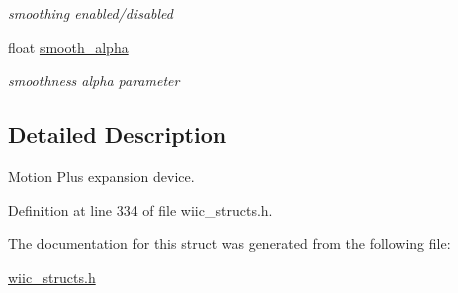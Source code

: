 \begin{DoxyCompactItemize}
\begin{DoxyCompactList}\small\item\em smoothing enabled/disabled \end{DoxyCompactList}\item 
\hypertarget{structmotion__plus__t_ab5eda5d43a79e927542d25338c3a7989}{float \hyperlink{structmotion__plus__t_ab5eda5d43a79e927542d25338c3a7989}{smooth\-\_\-alpha}}\label{structmotion__plus__t_ab5eda5d43a79e927542d25338c3a7989}

\begin{DoxyCompactList}\small\item\em smoothness alpha parameter \end{DoxyCompactList}\end{DoxyCompactItemize}


\subsection{Detailed Description}
Motion Plus expansion device. 

Definition at line 334 of file wiic\-\_\-structs.\-h.



The documentation for this struct was generated from the following file\-:\begin{DoxyCompactItemize}
\item 
\hyperlink{wiic__structs_8h}{wiic\-\_\-structs.\-h}\end{DoxyCompactItemize}
